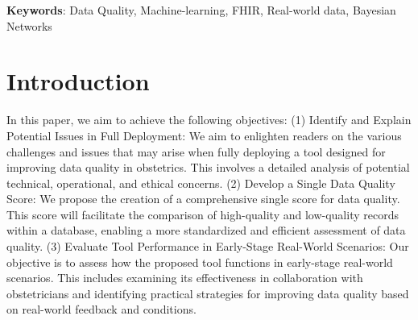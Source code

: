 \documentclass[]{article}
\begin{document}
\textbf{Keywords}: Data Quality, Machine-learning, FHIR, Real-world data, Bayesian Networks


%



%
%
%





%
%
\section{Introduction}



In this paper, we aim to achieve the following objectives:
(1) Identify and Explain Potential Issues in Full Deployment: We aim to enlighten readers on the various challenges and issues that may arise when fully deploying a tool designed for improving data quality in obstetrics. This involves a detailed analysis of potential technical, operational, and ethical concerns. (2) Develop a Single Data Quality Score: We propose the creation of a comprehensive single score for data quality. This score will facilitate the comparison of high-quality and low-quality records within a database, enabling a more standardized and efficient assessment of data quality. (3) Evaluate Tool Performance in Early-Stage Real-World Scenarios: Our objective is to assess how the proposed tool functions in early-stage real-world scenarios. This includes examining its effectiveness in collaboration with obstetricians and identifying practical strategies for improving data quality based on real-world feedback and conditions.
\end{document}
